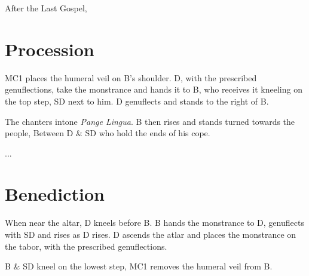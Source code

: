 \documentclass[letterpaper]{report}
\begin{document}
\rubric After the Last Gospel, 

\section{Procession}

\rubric MC1 places the humeral veil on B's shoulder. D, with the prescribed
genuflections, take the monstrance and hands it to B, who receives it kneeling
on the top step, SD next to him. D genuflects and stands to the right of B.

\rubric The chanters intone \textit{Pange Lingua}. B then rises and stands
turned towards the people, Between D \& SD who hold the ends of his cope.

\rubric ...

\section{Benediction}

\rubric When near the altar, D kneels before B. B hands the monstrance to D,
genuflects with SD and rises as D rises. D ascends the atlar and places the
monstrance on the tabor, with the prescribed genuflections.

\rubric B \& SD kneel on the lowest step, MC1 removes the humeral veil from B.

\printbibliography
\end{document}
